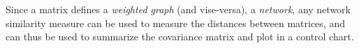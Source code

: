 \begin{extra}
Since a matrix defines a \emph{weighted graph} (and vise-versa), \aka a \emph{network}, any network similarity measure can be used to measure the distances between matrices, and can thus be used to summarize the covariance matrix and plot in a control chart.
\end{extra}







%
%
%
%
%
%
%
%
